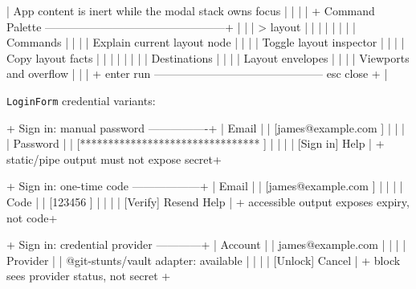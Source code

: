 \begin{CodeBlock}
| App content is inert while the modal stack owns focus                  |
|                                                                        |
|   + Command Palette ------------------------------------------------+  |
|   | > layout                                                       |  |
|   |                                                                |  |
|   | Commands                                                       |  |
|   |   Explain current layout node                                  |  |
|   |   Toggle layout inspector                                      |  |
|   |   Copy layout facts                                            |  |
|   |                                                                |  |
|   | Destinations                                                    |  |
|   |   Layout envelopes                                              |  |
|   |   Viewports and overflow                                        |  |
|   + enter run --------------------------------------------- esc close +  |
\end{CodeBlock}

\texttt{L\allowbreak{}o\allowbreak{}g\allowbreak{}i\allowbreak{}n\allowbreak{}F\allowbreak{}o\allowbreak{}r\allowbreak{}m} credential variants:

\begin{CodeBlock}
+ Sign in: manual password ----------------+
| Email                                    |
| [james@example.com                    ]  |
|                                          |
| Password                                 |
| [********************************      ]  |
|                                          |
| [Sign in]                         Help   |
+ static/pipe output must not expose secret+

+ Sign in: one-time code ------------------+
| Email                                    |
| [james@example.com                    ]  |
|                                          |
| Code                                     |
| [123456                              ]   |
|                                          |
| [Verify]                  Resend    Help |
+ accessible output exposes expiry, not code+

+ Sign in: credential provider ------------+
| Account                                  |
| james@example.com                        |
|                                          |
| Provider                                 |
| @git-stunts/vault adapter: available     |
|                                          |
| [Unlock]                         Cancel  |
+ block sees provider status, not secret   +
\end{CodeBlock}

